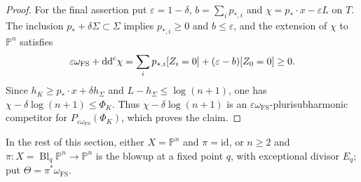 \begin{proof}
For the final assertion put $\varepsilon=1-\delta$, $b=\sum_i p_{*,i}$ and $\chi=p_*\cdot x-\varepsilon L$ on $T$. The inclusion $p_*+\delta\Sigma\subset\Sigma$ implies $p_{*,i}\geq0$ and $b\leq\varepsilon$, and the extension of $\chi$ to $\mathbb P^n$ satisfies
\[
 \varepsilon\omega_{\mathrm{FS}}+\mathrm{dd}^{\mathrm{c}}\chi
 =\sum_i p_{*,i}[Z_i=0]+(\varepsilon-b)[Z_0=0]\geq0.
\]
Since $h_K\geq p_*\cdot x+\delta h_\Sigma$ and $L-h_\Sigma\leq\log(n+1)$, one has $\chi-\delta\log(n+1)\leq\Phi_K$. Thus $\chi-\delta\log(n+1)$ is an $\varepsilon\omega_{\mathrm{FS}}$-plurisubharmonic competitor for $P_{\varepsilon\omega_{\mathrm{FS}}}(\Phi_K)$, which proves the claim.
\end{proof}

In the rest of this section, either $X=\mathbb P^n$ and $\pi=\mathrm{id}$, or $n\geq2$ and $\pi\colon X=\operatorname{Bl}_q\mathbb P^n\to\mathbb P^n$ is the blowup at a fixed point $q$, with exceptional divisor $E_q$; put $\Theta=\pi^*\omega_{\mathrm{FS}}$.

